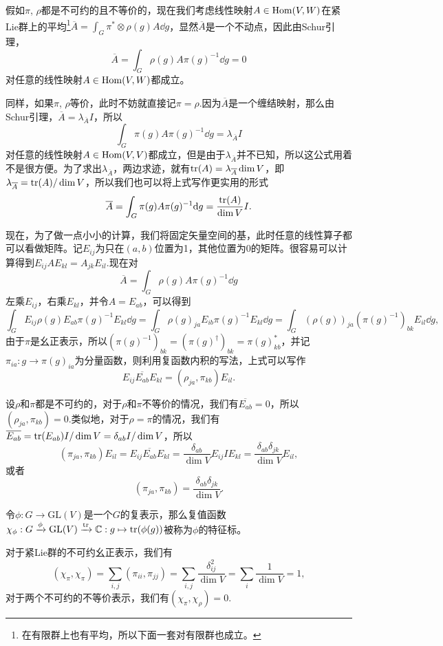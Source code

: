 假如$\pi$, $\rho$都是不可约的且不等价的，现在我们考虑线性映射$A\in \operatorname{Hom}(V,W)$在紧Lie群上的平均\footnote{在有限群上也有平均，所以下面一套对有限群也成立。}$\overline{A}=\int_G \pi^*\otimes\rho(g)A \dd g$，显然$\overline{A}$是一个不动点，因此由Schur引理，
\[
	\overline{A}=\int_G \rho(g)A\pi(g)^{-1}\dd g=0
\]
对任意的线性映射$A\in \operatorname{Hom}(V,W)$都成立。

同样，如果$\pi$, $\rho$等价，此时不妨就直接记$\pi=\rho$.因为$\overline{A}$是一个缠结映射，那么由Schur引理，$\overline{A}=\lambda_{\overline{A}} I$，所以
\[
	\int_G \pi(g)A\pi(g)^{-1}\dd g=\lambda_{\overline{A}} I
\]
对任意的线性映射$A\in \operatorname{Hom}(V,V)$都成立，但是由于$\lambda_{\overline{A}}$并不已知，所以这公式用着不是很方便。为了求出$\lambda_{\overline{A}}$，两边求迹，就有$\operatorname{tr}(A)=\lambda_{\overline{A}} \dim V$，即$\lambda_{\overline{A}}=\operatorname{tr}(A)/\dim V$，所以我们也可以将上式写作更实用的形式
\[
	\overline{A}=\int_G \pi(g)A\pi(g)^{-1}\mathrm{d} g=\frac{\operatorname{tr}(A)}{\dim V}I.
\]

\para 现在，为了做一点小小的计算，我们将固定矢量空间的基，此时任意的线性算子都可以看做矩阵。记$E_{ij}$为只在$(a,b)$位置为1，其他位置为0的矩阵。很容易可以计算得到$E_{ij}AE_{kl}=A_{jk}E_{il}$.现在对
\[
	\overline{A}=\int_G \rho(g)A\pi(g)^{-1}\dd g
\]
左乘$E_{ij}$，右乘$E_{kl}$，并令$A=E_{ab}$，可以得到
\[
	\int_G E_{ij}\rho(g)E_{ab}\pi(g)^{-1}E_{kl}\dd g=\int_G \rho(g)_{ja}E_{ib}\pi(g)^{-1}E_{kl}\dd g=\int_G (\rho(g))_{ja}\left(\pi(g)^{-1}\right)_{bk}E_{il}\dd g,
\]
由于$\pi$是幺正表示，所以$\left(\pi(g)^{-1}\right)_{bk}=\left(\pi(g)^{\dag}\right)_{bk}=\pi(g)_{kb}^*$，并记$\pi_{ia}:g\to \pi(g)_{ia}$为分量函数，则利用复函数内积的写法，上式可以写作
\[
	E_{ij}\overline{E_{ab}}E_{kl}=\left(\rho_{ja},\pi_{kb}\right)E_{il}.
\]

\para 设$\rho$和$\pi$都是不可约的，对于$\rho$和$\pi$不等价的情况，我们有$\overline{E_{ab}}=0$，所以$\left(\rho_{ja},\pi_{kb}\right)=0$.类似地，对于$\rho=\pi$的情况，我们有$\overline{E_{ab}}=\operatorname{tr}(E_{ab})I/\dim V=\delta_{ab}I/\dim V$，所以
\[
	\left(\pi_{ja},\pi_{kb}\right)E_{il}=E_{ij}\overline{E_{ab}}E_{kl}=\frac{\delta_{ab}}{\dim V}E_{ij}IE_{kl}=\frac{\delta_{ab}\delta_{jk}}{\dim V}E_{il},
\]
或者
\[
	\left(\pi_{ja},\pi_{kb}\right)=\frac{\delta_{ab}\delta_{jk}}{\dim V}.
\]

\para 令$\phi:G\to \mathrm{GL}(V)$是一个$G$的复表示，那么复值函数$\chi_\phi:G\xrightarrow{\phi}\mathrm{GL}(V)\xrightarrow{\operatorname{tr}}\mathbb{C}:g\mapsto \operatorname{tr}(\phi(g))$被称为$\phi$的特征标。

对于紧Lie群的不可约幺正表示，我们有
\[
(\chi_\pi, \chi_\pi)=\sum_{i,j}(\pi_{ii},\pi_{jj})=\sum_{i,j}\frac{\delta_{ij}^2}{\dim V}=\sum_{i}\frac{1}{\dim V}=1,
\]
对于两个不可约的不等价表示，我们有$(\chi_\pi, \chi_\rho)=0$.

